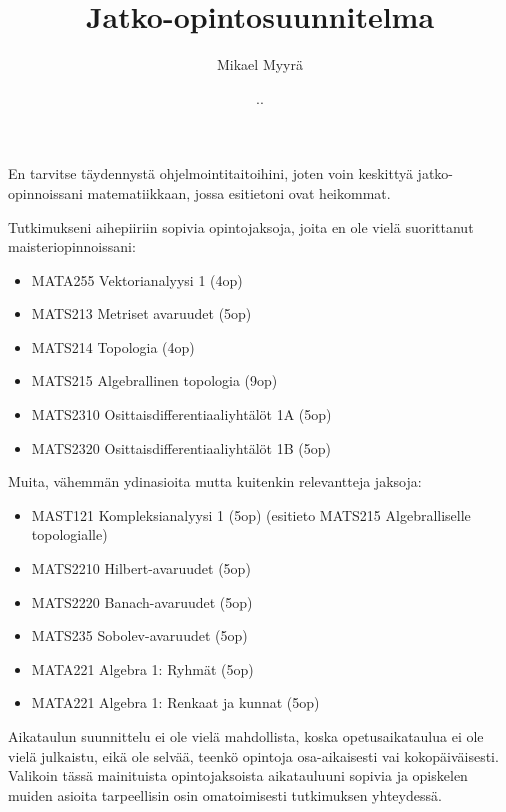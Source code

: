 \documentclass{article}
\title{Jatko-opintosuunnitelma}
\author{Mikael Myyrä}
\date{\number\day.\number\month.\number\year}
\begin{document}
\maketitle

En tarvitse täydennystä ohjelmointitaitoihini,
joten voin keskittyä jatko-opinnoissani matematiikkaan,
jossa esitietoni ovat heikommat.


Tutkimukseni aihepiiriin sopivia opintojaksoja,
joita en ole vielä suorittanut maisteriopinnoissani:

\begin{itemize}
  \item MATA255 Vektorianalyysi 1 (4op) %
  \item MATS213 Metriset avaruudet (5op)
  \item MATS214 Topologia (4op)
  \item MATS215 Algebrallinen topologia (9op) %
  \item MATS2310 Osittaisdifferentiaaliyhtälöt 1A (5op)
  \item MATS2320 Osittaisdifferentiaaliyhtälöt 1B (5op)
\end{itemize}

Muita, vähemmän ydinasioita mutta kuitenkin relevantteja jaksoja:

\begin{itemize}
  \item MAST121 Kompleksianalyysi 1 (5op)
    (esitieto MATS215 Algebralliselle topologialle)
  \item MATS2210 Hilbert-avaruudet (5op)
  \item MATS2220 Banach-avaruudet (5op)
  \item MATS235 Sobolev-avaruudet (5op)
  \item MATA221 Algebra 1: Ryhmät (5op)
  \item MATA221 Algebra 1: Renkaat ja kunnat (5op)
\end{itemize}

Aikataulun suunnittelu ei ole vielä mahdollista,
koska opetusaikataulua ei ole vielä julkaistu,
eikä ole selvää, teenkö opintoja osa-aikaisesti vai kokopäiväisesti.
Valikoin tässä mainituista opintojaksoista aikatauluuni sopivia
ja opiskelen muiden asioita tarpeellisin osin omatoimisesti tutkimuksen yhteydessä.
\end{document}
